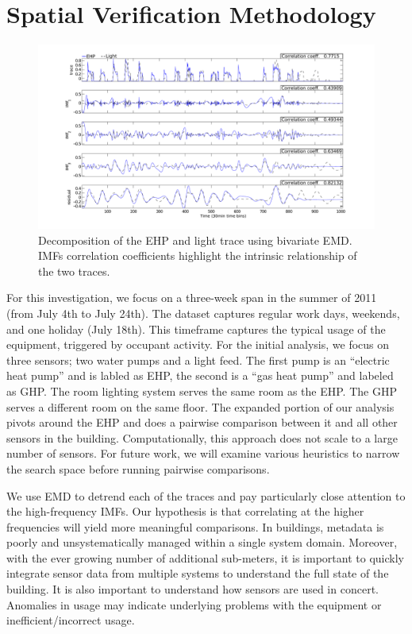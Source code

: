 \section{Spatial Verification Methodology}

\begin{figure}[tb]
\hspace{-2cm}
\includegraphics[width=1.2\textwidth]{figs/emd_25_26-eps-converted-to}
\vspace{-1cm}
\caption{Decomposition of the EHP and light trace using bivariate EMD. IMFs correlation coefficients highlight the intrinsic relationship of the two traces.}
\label{fig:emd}
\end{figure}

For this investigation, we focus on a three-week span in the summer of 2011 (from July 4th to July 24th).
The dataset captures regular work days, weekends, and one holiday (July 18th).  This timeframe captures
the typical usage of the equipment, triggered by occupant activity.  For the initial
analysis, we focus on three sensors; two water pumps and a light feed.  The first pump is an 
``electric heat pump'' and is labled as EHP, the second  is a ``gas heat pump''
and labeled as GHP.  The room lighting system serves the same room as the EHP.  The GHP
serves a different room on the same floor.  The expanded portion of our analysis pivots around the EHP
and does a pairwise comparison between it and all other sensors in the building.
Computationally, this approach does not scale to a large number of sensors.  For future work, we will
examine various heuristics to narrow the search space before running pairwise comparisons.

We use EMD to detrend each of the traces and pay particularly close attention to the high-frequency IMFs.  Our 
hypothesis is that correlating at the higher frequencies will yield more meaningful comparisons.
In buildings, metadata is poorly and unsystematically managed within a single system domain.  Moreover, 
with the ever growing number of additional sub-meters, it is important to quickly integrate
sensor data from multiple systems to understand the full state of the building.  It is also important to 
understand how sensors are used in concert.  Anomalies in usage may indicate underlying problems with 
the equipment or inefficient/incorrect usage.  

